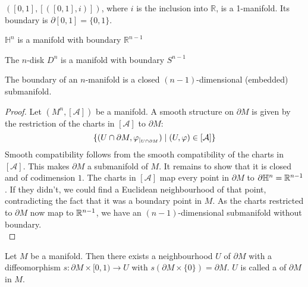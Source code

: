 \documentclass[a4paper,11pt]{article}
\begin{document}
\begin{example}
    \(([0,1],[([0,1],i)])\), where \(i\) is the inclusion into \(\mathbb{R}\), is a 1-manifold. Its boundary is \(\partial [0,1]=\{0,1\}\).
\end{example}

\begin{example}
    \(\mathbb{H}^n\) is a manifold with boundary \(\mathbb{R}^{n-1}\)
\end{example}

\begin{example}
    The \(n\)-disk \(D^n\) is a manifold with boundary \(S^{n-1}\)
\end{example}

\begin{theorem}\label{boundary manifold}
    The boundary of an \(n\)-manifold is a closed \((n-1)\)-dimensional (embedded) submanifold.
\end{theorem}

\begin{proof}
    Let \((M^n,[\mathcal{A}])\) be a manifold. A smooth structure on \(\partial M\) is given by the restriction of the charts in \([\mathcal{A}]\) to \(\partial M\): \[\{(U\cap\partial M,\varphi_{|_{U\cap\partial M}})\mid (U,\varphi)\in[\mathcal{A}]\}\]
    Smooth compatibility follows from the smooth compatibility of the charts in \([\mathcal{A}]\). This makes \(\partial M\) a submanifold of \(M\). It remains to show that it is closed and of codimension \(1\). The charts in \([\mathcal{A}]\) map every point in \(\partial M\) to \(\partial\mathbb{H}^n=\mathbb{R}^{n-1}\). If they didn't, we could find a Euclidean neighbourhood of that point, contradicting the fact that it was a boundary point in \(M\). As the charts restricted to \(\partial M\) now map to \(\mathbb{R}^{n-1}\), we have an \((n-1)\)-dimensional submanifold without boundary.\\
\end{proof}

\begin{theorem}\label{collar}
    Let \(M\) be a manifold. Then there exists a neighbourhood \(U\) of \(\partial M\) with a diffeomorphism \(s:\partial M\times [0,1)\to U\) with \(s(\partial M\times\{0\})=\partial M\). \(U\) is called a  of \(\partial M\) in \(M\).
\end{theorem}
\end{document}
